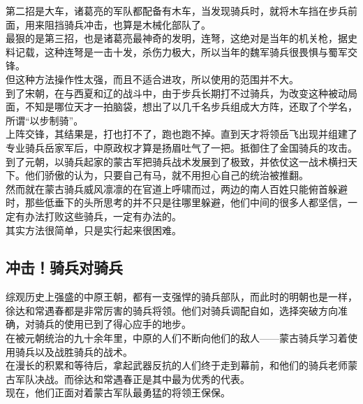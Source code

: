 \begin{multicols}{\theparacolNo}
第二招是大车，诸葛亮的军队都配备有木车，当发现骑兵时，就将木车挡在步兵前面，用来阻挡骑兵冲击，也算是木械化部队了。\\

最狠的是第三招，也是诸葛亮最神奇的发明，连弩，这绝对是当年的机关枪，据史料记载，这种连弩是一击十发，杀伤力极大，所以当年的魏军骑兵很畏惧与蜀军交锋。\\

但这种方法操作性太强，而且不适合进攻，所以使用的范围并不大。\\

到了宋朝，在与西夏和辽的战斗中，由于步兵长期打不过骑兵，为改变这种被动局面，不知是哪位天才一拍脑袋，想出了以几千名步兵组成大方阵，还取了个学名，所谓“以步制骑”。\\

上阵交锋，其结果是，打也打不了，跑也跑不掉。直到天才将领岳飞出现并组建了专业骑兵岳家军后，中原政权才算是扬眉吐气了一把。抵御住了金国骑兵的攻击。\\

到了元朝，以骑兵起家的蒙古军把骑兵战术发展到了极致，并依仗这一战术横扫天下。他们骄傲的认为，只要自己有马，就不用担心自己的统治被推翻。\\

然而就在蒙古骑兵威风凛凛的在官道上呼啸而过，两边的南人百姓只能俯首躲避时，那些低垂下的头所思考的并不只是往哪里躲避，他们中间的很多人都坚信，一定有办法打败这些骑兵，一定有办法的。\\

其实方法很简单，只是实行起来很困难。\\

\subsection{冲击！骑兵对骑兵}
综观历史上强盛的中原王朝，都有一支强悍的骑兵部队，而此时的明朝也是一样，徐达和常遇春都是非常厉害的骑兵将领。他们对骑兵调配自如，选择突破方向准确，对骑兵的使用已到了得心应手的地步。\\

在被元朝统治的九十余年里，中原的人们不断向他们的敌人——蒙古骑兵学习着使用骑兵以及战胜骑兵的战术。\\

在漫长的积累和等待后，拿起武器反抗的人们终于走到幕前，和他们的骑兵老师蒙古军队决战。而徐达和常遇春正是其中最为优秀的代表。\\

现在，他们正面对着蒙古军队最勇猛的将领王保保。\\


\end{multicols}
